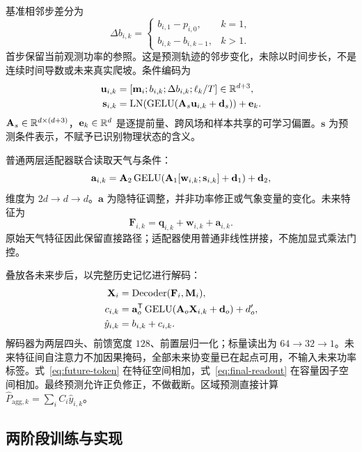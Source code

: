 基准相邻步差分为
\begin{equation}
 \Delta b_{i,k}=\begin{cases}b_{i,1}-p_{i,0},&k=1,\\
 b_{i,k}-b_{i,k-1},&k>1.\end{cases}\label{eq:baseline-difference}
\end{equation}
首步保留当前观测功率的参照。这是预测轨迹的邻步变化，未除以时间步长，不是连续时间导数或未来真实爬坡。条件编码为
\begin{align}
 \mathbf u_{i,k}&=[\mathbf m_i;b_{i,k};\Delta b_{i,k};\ell_k/T]\in\mathbb{R}^{d+3},\\
 \mathbf s_{i,k}&=\operatorname{LN}\!\left(\operatorname{GELU}(\mathbf A_s\mathbf u_{i,k}+\mathbf d_s)\right)+\mathbf e_k.
 \label{eq:condition}
\end{align}
$\mathbf A_s\in\mathbb{R}^{d\times(d+3)}$，$\mathbf e_k\in\mathbb{R}^d$ 是逐提前量、跨风场和样本共享的可学习偏置。$\mathbf s$ 为预测条件表示，不赋予已识别物理状态的含义。

普通两层适配器联合读取天气与条件：
\begin{equation}
 \mathbf a_{i,k}=\mathbf A_2\operatorname{GELU}\!\left(
 \mathbf A_1[\mathbf w_{i,k};\mathbf s_{i,k}]+\mathbf d_1\right)+\mathbf d_2,
 \label{eq:adapter}
\end{equation}
维度为 $2d\rightarrow d\rightarrow d$。$\mathbf a$ 为隐特征调整，并非功率修正或气象变量的变化。未来特征为
\begin{equation}
 \mathbf F_{i,k}=\mathbf q_{i,k}+\mathbf w_{i,k}+\mathbf a_{i,k}.
 \label{eq:future-token}
\end{equation}
原始天气特征因此保留直接路径；适配器使用普通非线性拼接，不施加显式乘法门控。

叠放各未来步后，以完整历史记忆进行解码：
\begin{align}
 \mathbf X_i&=\operatorname{Decoder}(\mathbf F_i,\mathbf M_i),\\
 c_{i,k}&=\mathbf a_o^{\mathsf{T}}\operatorname{GELU}(\mathbf A_o\mathbf X_{i,k}+\mathbf d_o)+d_o',\\
 \hat y_{i,k}&=b_{i,k}+c_{i,k}.\label{eq:final-readout}
\end{align}
解码器为两层四头、前馈宽度 $128$、前置层归一化；标量读出为 $64\rightarrow32\rightarrow1$。未来特征间自注意力不加因果掩码，全部未来协变量已在起点可用，不输入未来功率标签。式~\eqref{eq:future-token} 在特征空间相加，式~\eqref{eq:final-readout} 在容量因子空间相加。最终预测允许正负修正，不做截断。区域预测直接计算 $\hat P_{\mathrm{agg},k}=\sum_i C_i\hat y_{i,k}$。

\subsection{两阶段训练与实现}
\label{sec:training}

